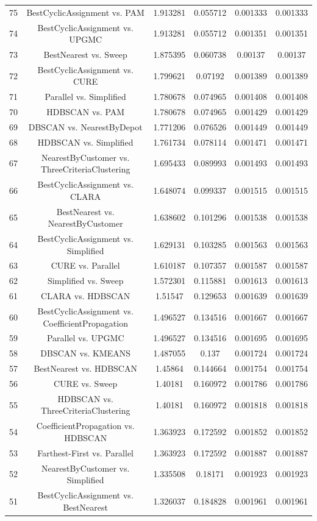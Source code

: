 \documentclass[a4paper,10pt]{article}
\begin{document}
\begin{landscape}
\begin{table}[!htp]
\begin{tabular}{cccccc}
75&BestCyclicAssignment vs. PAM&1.913281&0.055712&0.001333&0.001333\\
74&BestCyclicAssignment vs. UPGMC&1.913281&0.055712&0.001351&0.001351\\
73&BestNearest vs. Sweep&1.875395&0.060738&0.00137&0.00137\\
72&BestCyclicAssignment vs. CURE&1.799621&0.07192&0.001389&0.001389\\
71&Parallel vs. Simplified&1.780678&0.074965&0.001408&0.001408\\
70&HDBSCAN vs. PAM&1.780678&0.074965&0.001429&0.001429\\
69&DBSCAN vs. NearestByDepot&1.771206&0.076526&0.001449&0.001449\\
68&HDBSCAN vs. Simplified&1.761734&0.078114&0.001471&0.001471\\
67&NearestByCustomer vs. ThreeCriteriaClustering&1.695433&0.089993&0.001493&0.001493\\
66&BestCyclicAssignment vs. CLARA&1.648074&0.099337&0.001515&0.001515\\
65&BestNearest vs. NearestByCustomer&1.638602&0.101296&0.001538&0.001538\\
64&BestCyclicAssignment vs. Simplified&1.629131&0.103285&0.001563&0.001563\\
63&CURE vs. Parallel&1.610187&0.107357&0.001587&0.001587\\
62&Simplified vs. Sweep&1.572301&0.115881&0.001613&0.001613\\
61&CLARA vs. HDBSCAN&1.51547&0.129653&0.001639&0.001639\\
60&BestCyclicAssignment vs. CoefficientPropagation&1.496527&0.134516&0.001667&0.001667\\
59&Parallel vs. UPGMC&1.496527&0.134516&0.001695&0.001695\\
58&DBSCAN vs. KMEANS&1.487055&0.137&0.001724&0.001724\\
57&BestNearest vs. HDBSCAN&1.45864&0.144664&0.001754&0.001754\\
56&CURE vs. Sweep&1.40181&0.160972&0.001786&0.001786\\
55&HDBSCAN vs. ThreeCriteriaClustering&1.40181&0.160972&0.001818&0.001818\\
54&CoefficientPropagation vs. HDBSCAN&1.363923&0.172592&0.001852&0.001852\\
53&Farthest-First vs. Parallel&1.363923&0.172592&0.001887&0.001887\\
52&NearestByCustomer vs. Simplified&1.335508&0.18171&0.001923&0.001923\\
51&BestCyclicAssignment vs. BestNearest&1.326037&0.184828&0.001961&0.001961\\

\end{tabular}
\end{table}
\end{landscape}
\end{document}
